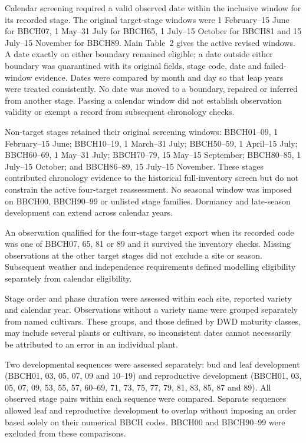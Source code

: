 \documentclass[a4paper,11pt]{article}
\begin{document}
Calendar screening required a valid observed date within the inclusive window for its recorded stage. The original target-stage windows were 1 February--15 June for BBCH07, 1 May--31 July for BBCH65, 1 July--15 October for BBCH81 and 15 July--15 November for BBCH89. Main Table~2 gives the active revised windows. A date exactly on either boundary remained eligible; a date outside either boundary was quarantined with its original fields, stage code, date and failed-window evidence. Dates were compared by month and day so that leap years were treated consistently. No date was moved to a boundary, repaired or inferred from another stage. Passing a calendar window did not establish observation validity or exempt a record from subsequent chronology checks.

Non-target stages retained their original screening windows: BBCH01--09, 1 February--15 June; BBCH10--19, 1 March--31 July; BBCH50--59, 1 April--15 July; BBCH60--69, 1 May--31 July; BBCH70--79, 15 May--15 September; BBCH80--85, 1 July--15 October; and BBCH86--89, 15 July--15 November. These stages contributed chronology evidence to the historical full-inventory screen but do not constrain the active four-target reassessment. No seasonal window was imposed on BBCH00, BBCH90--99 or unlisted stage families. Dormancy and late-season development can extend across calendar years.

An observation qualified for the four-stage target export when its recorded code was one of BBCH07, 65, 81 or 89 and it survived the inventory checks. Missing observations at the other target stages did not exclude a site or season. Subsequent weather and independence requirements defined modelling eligibility separately from calendar eligibility.



Stage order and phase duration were assessed within each site, reported variety and calendar year. Observations without a variety name were grouped separately from named cultivars. These groups, and those defined by DWD maturity classes, may include several plants or cultivars, so inconsistent dates cannot necessarily be attributed to an error in an individual plant.

Two developmental sequences were assessed separately: bud and leaf development (BBCH01, 03, 05, 07, 09 and 10--19) and reproductive development (BBCH01, 03, 05, 07, 09, 53, 55, 57, 60--69, 71, 73, 75, 77, 79, 81, 83, 85, 87 and 89). All observed stage pairs within each sequence were compared. Separate sequences allowed leaf and reproductive development to overlap without imposing an order based solely on their numerical BBCH codes. BBCH00 and BBCH90--99 were excluded from these comparisons.
\end{document}
